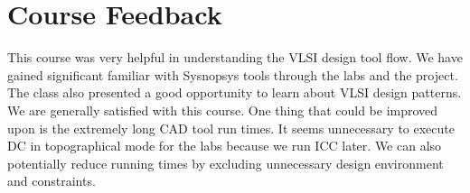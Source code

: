 \section*{Course Feedback}
This course was very helpful in understanding the VLSI design tool flow. We have gained significant  familiar with Sysnopsys tools through the labs and the project. The class also presented a good opportunity to learn about VLSI design patterns. We are generally satisfied with this course. One thing that could be improved upon is the extremely long CAD tool run times. It seems unnecessary to execute DC in topographical mode for the labs because we run ICC later. We can also potentially reduce running times by excluding unnecessary design environment and constraints.
